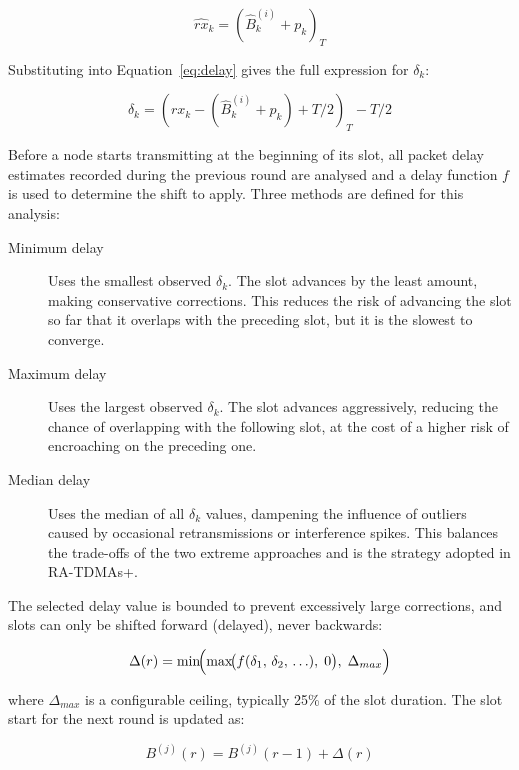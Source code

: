 \begin{equation}
\hat{rx}_k = (\hat{B}^{(i)}_k + p_k)_T
\label{eq:expected-rx}
\end{equation}

Substituting into Equation~\ref{eq:delay} gives the full expression
for $\delta_k$:

\begin{equation}
\delta_k = (rx_k - (\hat{B}^{(i)}_k + p_k) + T/2)_T - T/2
\label{eq:delay-full}
\end{equation}

Before a node starts transmitting at the beginning of its slot, all
packet delay estimates recorded during the previous round are analysed
and a delay function $f$ is used to determine the shift to apply. Three
methods are defined for this analysis:

\begin{description}
\item[Minimum delay] Uses the smallest observed $\delta_k$. The slot
  advances by the least amount, making conservative corrections. This
  reduces the risk of advancing the slot so far that it overlaps with
  the preceding slot, but it is the slowest to converge.
\item[Maximum delay] Uses the largest observed $\delta_k$. The slot
  advances aggressively, reducing the chance of overlapping with the
  following slot, at the cost of a higher risk of encroaching on the
  preceding one.
\item[Median delay] Uses the median of all $\delta_k$ values,
  dampening the influence of outliers caused by occasional retransmissions
  or interference spikes. This balances the trade-offs of the two
  extreme approaches and is the strategy adopted in RA-TDMAs+.
\end{description}

The selected delay value is bounded to prevent excessively large
corrections, and slots can only be shifted forward (delayed), never
backwards:

\begin{equation}
\Delta(r) = \min\!\Bigl(\max\!\bigl(f(\delta_1,\,\delta_2,\,\ldots),\;0\bigr),\;
\Delta_{max}\Bigr)
\label{eq:shift}
\end{equation}

where $\Delta_{max}$ is a configurable ceiling, typically 25\% of the
slot duration. The slot start for the next round is updated as:

\begin{equation}
B^{(j)}(r) = B^{(j)}(r-1) + \Delta(r)
\label{eq:slot-start}
\end{equation}


